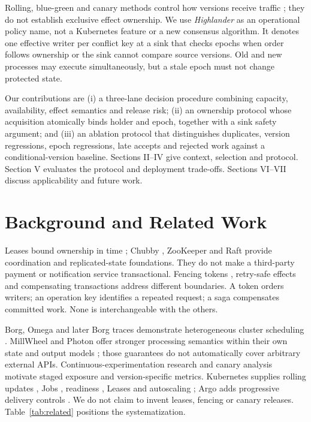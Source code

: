 \documentclass[conference,10pt]{IEEEtran}
\begin{document}
Rolling, blue-green and canary methods control how versions receive traffic \cite{r1,r2,r3}; they do not establish exclusive effect ownership. We use \emph{Highlander} as an operational policy name, not a Kubernetes feature or a new consensus algorithm. It denotes one effective writer per conflict key at a sink that checks epochs when order follows ownership or the sink cannot compare source versions. Old and new processes may execute simultaneously, but a stale epoch must not change protected state.

Our contributions are (i) a three-lane decision procedure combining capacity, availability, effect semantics and release risk; (ii) an ownership protocol whose acquisition atomically binds holder and epoch, together with a sink safety argument; and (iii) an ablation protocol that distinguishes duplicates, version regressions, epoch regressions, late accepts and rejected work against a conditional-version baseline. Sections II--IV give context, selection and protocol. Section V evaluates the protocol and deployment trade-offs. Sections VI--VII discuss applicability and future work.

\section{Background and Related Work}
Leases bound ownership in time \cite{r4}; Chubby \cite{r5}, ZooKeeper \cite{r6} and Raft \cite{r7} provide coordination and replicated-state foundations. They do not make a third-party payment or notification service transactional. Fencing tokens \cite{r8}, retry-safe effects \cite{r9} and compensating transactions \cite{r10} address different boundaries. A token orders writers; an operation key identifies a repeated request; a saga compensates committed work. None is interchangeable with the others.

Borg, Omega and later Borg traces demonstrate heterogeneous cluster scheduling \cite{r11,r12,r13}. MillWheel and Photon offer stronger processing semantics within their own state and output models \cite{r14,r15}; those guarantees do not automatically cover arbitrary external APIs. Continuous-experimentation research \cite{r16} and canary analysis \cite{r17} motivate staged exposure and version-specific metrics. Kubernetes supplies rolling updates \cite{r1}, Jobs \cite{r18}, readiness \cite{r19}, Leases \cite{r20} and autoscaling \cite{r21}; Argo adds progressive delivery controls \cite{r22}. We do not claim to invent leases, fencing or canary releases. Table~\ref{tab:related} positions the systematization.
\end{document}
